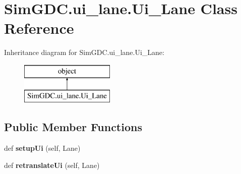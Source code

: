 \hypertarget{class_sim_g_d_c_1_1ui__lane_1_1_ui___lane}{}\section{Sim\+G\+D\+C.\+ui\+\_\+lane.\+Ui\+\_\+\+Lane Class Reference}
\label{class_sim_g_d_c_1_1ui__lane_1_1_ui___lane}
Inheritance diagram for Sim\+G\+D\+C.\+ui\+\_\+lane.\+Ui\+\_\+\+Lane\+:\begin{figure}[H]
\begin{center}
\leavevmode
\includegraphics[height=2.000000cm]{class_sim_g_d_c_1_1ui__lane_1_1_ui___lane}
\end{center}
\end{figure}
\subsection*{Public Member Functions}
\begin{DoxyCompactItemize}
\item 
\hypertarget{class_sim_g_d_c_1_1ui__lane_1_1_ui___lane_a0c6fa72d8b6cda3a8bcbb7ac15733217}{}def {\bfseries setup\+Ui} (self, Lane)\label{class_sim_g_d_c_1_1ui__lane_1_1_ui___lane_a0c6fa72d8b6cda3a8bcbb7ac15733217}

\item 
\hypertarget{class_sim_g_d_c_1_1ui__lane_1_1_ui___lane_a137983d33bd1be753722c6c666515fcd}{}def {\bfseries retranslate\+Ui} (self, Lane)\label{class_sim_g_d_c_1_1ui__lane_1_1_ui___lane_a137983d33bd1be753722c6c666515fcd}

\end{DoxyCompactItemize}
